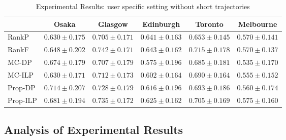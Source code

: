 \begin{table*}
    \centering
    \caption{Experimental Results: user specific setting without short trajectories}
    \begin{tabular}{l|ccccc} \hline
         & Osaka & Glasgow & Edinburgh & Toronto & Melbourne \\ \hline
        RankP & $0.630\pm0.175$ & $0.705\pm0.171$ & $0.641\pm0.163$ & $0.653\pm0.145$ & $0.570\pm0.141$ \\
        RankF & $0.648\pm0.202$ & $\mathbf{0.742\pm0.171}$ & $\mathbf{0.643\pm0.162}$ & $\mathbf{0.715\pm0.178}$ & $0.570\pm0.137$ \\
        MC-DP & $0.674\pm0.179$ & $0.707\pm0.179$ & $0.575\pm0.196$ & $0.685\pm0.181$ & $0.535\pm0.170$ \\
        MC-ILP & $0.630\pm0.171$ & $0.712\pm0.173$ & $0.602\pm0.164$ & $0.690\pm0.164$ & $0.555\pm0.152$ \\
        Prop-DP & $\mathbf{0.714\pm0.207}$ & $0.728\pm0.179$ & $0.616\pm0.196$ & $0.693\pm0.186$ & $0.560\pm0.174$ \\
        Prop-ILP & $0.681\pm0.194$ & $0.735\pm0.172$ & $0.625\pm0.162$ & $0.705\pm0.169$ & $\mathbf{0.575\pm0.160}$ \\
        \hline
    \end{tabular}
\end{table*}

\subsection{Analysis of Experimental Results}
\label{experiment:analysis}
